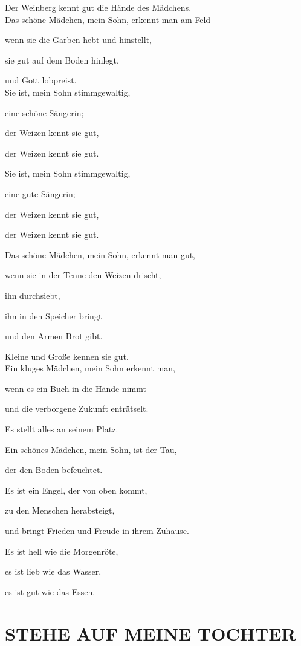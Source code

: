 \documentclass[11pt,a5paper,twoside]{article}
\begin{document}
Der Weinberg kennt gut die Hände des Mädchens.\\

Das schöne Mädchen, mein Sohn, erkennt man am Feld

wenn sie die Garben hebt und hinstellt,

sie gut auf dem Boden hinlegt,

und Gott lobpreist.\\

Sie ist, mein Sohn stimmgewaltig,

eine schöne Sängerin;

der Weizen kennt sie gut,

der Weizen kennt sie gut.

Sie ist, mein Sohn stimmgewaltig,

eine gute Sängerin;

der Weizen kennt sie gut,

der Weizen kennt sie gut.

Das schöne Mädchen, mein Sohn, erkennt man gut, 

wenn sie in der Tenne den Weizen drischt,

ihn durchsiebt,

ihn in den Speicher bringt 

und den Armen Brot gibt.

Kleine und Große kennen sie gut.\\

Ein kluges Mädchen, mein Sohn erkennt man,

wenn es ein Buch in die Hände nimmt 

und die verborgene Zukunft enträtselt.

Es stellt alles an seinem Platz.

Ein schönes Mädchen, mein Sohn, ist der Tau,

der den Boden befeuchtet.

Es ist ein Engel, der von oben kommt,

zu den Menschen herabsteigt,

und bringt Frieden und Freude in ihrem Zuhause.

Es ist hell wie die Morgenröte,

es ist lieb wie das Wasser,

es ist gut wie das Essen.

\section[Stehe auf, meine Tochter]{STEHE AUF MEINE TOCHTER} 
\end{document}

